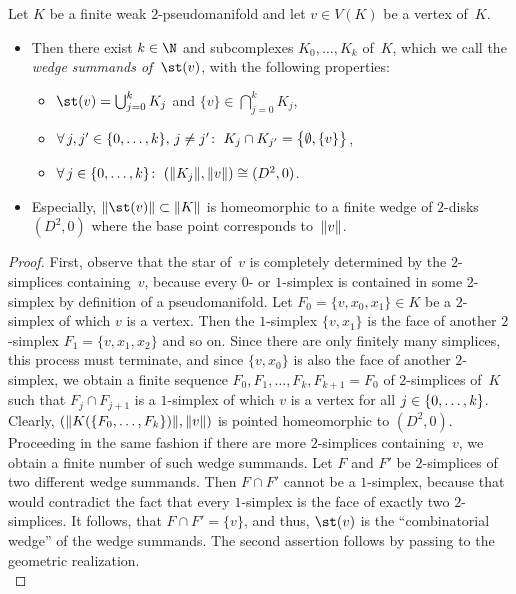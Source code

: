 \begin{thProposition}
    \label{ch4:starinpmfd}
    Let $K$ be a finite weak $2$-pseudo\-manifold and let $v\in V(K)$ be a vertex
    of~$K$.
    \begin{itemize}
        \item
            Then there exist $k\in\N$ and subcomplexes $K_0,\dots,K_k$ of~$K$,
            which we call the \emph{wedge summands of~$\st(v)$}, with the following
            properties:
            \begin{itemize}[labelsep=3mm,leftmargin=!]
                \item
                    $\st(v) = \bigcup_{j=0}^k K_j$
                    and $\{v\} \in \bigcap_{j=0}^k K_j$,
                \item
                    $\forall\,j,j'\in\{0,\ldots,k\},\,j\neq j'\colon\;
                    K_j\cap K_{j'} = \bigl\{\emptyset, \{v\}\bigr\}$,
                \item
                    $\forall\,j\in\{0,\ldots,k\}\colon\;
                    (\lVert K_j\rVert,\lVert v\rVert) \cong (D^2,0)$.
            \end{itemize}
            
        \item
            Especially, $\geom{\st(v)}\subset\geom{K}$ is homeomorphic to a
            finite wedge of $2$-disks~$(D^2,0)$ where the base point corresponds
            to~$\lVert v\rVert$.
    \end{itemize}
\end{thProposition}

\begin{proof}
    First, observe that the star of~$v$ is completely determined by the
    $2$-simplices containing~$v$, because every $0$- or $1$-simplex is
    contained in some $2$-simplex by definition of a pseudomanifold.
    Let $F_0=\{v,x_0,x_1\}\in K$ be a
    $2$-simplex of which $v$ is a vertex. Then the $1$-simplex
    $\{v,x_1\}$ is the face of another $2$-simplex $F_1=\{v,x_1,x_2\}$
    and so on. Since there are only finitely many simplices, this process
    must terminate, and since $\{v,x_0\}$ is also the face of another
    $2$-simplex, we obtain a finite sequence $F_0,F_1,\dots,F_k,F_{k+1}=F_0$
    of $2$-simplices of~$K$ such that $F_j\cap F_{j+1}$ is a $1$-simplex
    of which $v$ is a vertex for all $j\in\{0,\ldots,k\}$. %
    Clearly, $(\lVert K(\{F_0,\dots,F_k\})\rVert,\lVert v\rVert)$ is pointed
    homeomorphic to $(D^2,0)$. Proceeding in the same fashion if there are more
    $2$-simplices containing~$v$, we obtain a finite number of such wedge
    summands.
    Let $F$ and $F'$ be $2$-simplices of two different wedge summands.
    Then $F\cap F'$ cannot be a $1$-simplex, because that would contradict
    the fact that every $1$-simplex is the face of exactly two $2$-simplices.
    It follows, that $F\cap F' = \{v\}$, and thus, $\st(v)$ is the
    \enquote{combinatorial wedge} of the wedge summands. The second assertion
    follows by passing to the geometric realization.
    \\
\end{proof}

